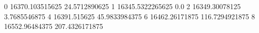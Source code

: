 0 16370.103515625 24.5712890625
1 16345.5322265625 0.0
2 16349.30078125 3.7685546875
4 16391.515625 45.9833984375
6 16462.26171875 116.7294921875
8 16552.96484375 207.4326171875
